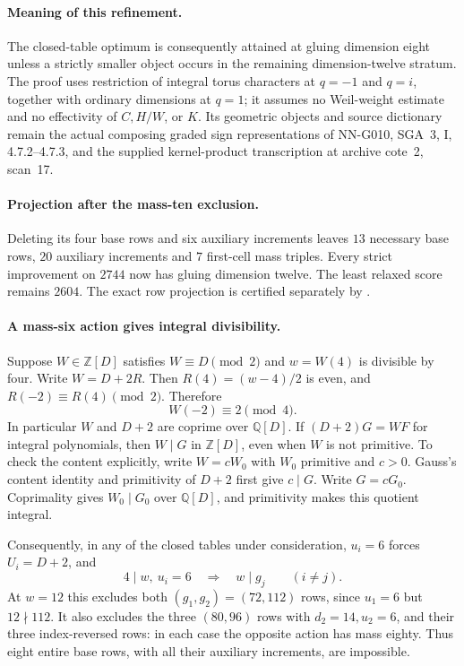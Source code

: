 \paragraph{Meaning of this refinement.}
The closed-table optimum is consequently attained at
gluing dimension eight unless a strictly smaller object
occurs in the remaining dimension-twelve stratum.
The proof uses restriction of integral torus characters
at $q=-1$ and $q=i$, together with ordinary dimensions
at $q=1$; it assumes no Weil-weight estimate and no
effectivity of $C,H/W$, or $K$.
Its geometric objects and source dictionary remain the
actual composing graded sign representations of NN-G010,
SGA~3, I, 4.7.2--4.7.3, and the supplied kernel-product
transcription at archive cote~2, scan~17.

\paragraph{Projection after the mass-ten exclusion.}
Deleting its four base rows and six auxiliary increments leaves
$13$ necessary base rows, $20$ auxiliary increments and
$7$ first-cell mass triples. Every strict improvement on
$2744$ now has gluing dimension twelve. The least relaxed
score remains $2604$. The exact row projection is certified
separately by .


\paragraph{A mass-six action gives integral divisibility.}
Suppose $W\in\mathbb Z[D]$ satisfies $W\equiv D\pmod2$
and $w=W(4)$ is divisible by four.
Write $W=D+2R$. Then $R(4)=(w-4)/2$ is even,
and $R(-2)\equiv R(4)\pmod2$. Therefore
\[
                         W(-2)\equiv2\pmod4.        \tag{G036.U1}
\]
In particular $W$ and $D+2$ are coprime over
$\mathbb Q[D]$.
If $(D+2)G=W F$ for integral polynomials, then
$W\mid G$ in $\mathbb Z[D]$, even when $W$ is
not primitive. To check the content explicitly,
write $W=cW_0$ with $W_0$ primitive and $c>0$.
Gauss's content identity and primitivity of $D+2$
first give $c\mid G$. Write $G=cG_0$.
Coprimality gives $W_0\mid G_0$ over $\mathbb Q[D]$,
and primitivity makes this quotient integral.

Consequently, in any of the closed tables under
consideration, $u_i=6$ forces $U_i=D+2$, and
\[
                 4\mid w,\ u_i=6
                 \quad\Longrightarrow\quad w\mid g_j
                 \qquad(i\ne j).                  \tag{G036.U2}
\]
At $w=12$ this excludes both $(g_1,g_2)=(72,112)$
rows, since $u_1=6$ but $12\nmid112$.
It also excludes the three $(80,96)$ rows with
$d_2=14,u_2=6$, and their three index-reversed rows:
in each case the opposite action has mass eighty.
Thus eight entire base rows, with all their auxiliary
increments, are impossible.

